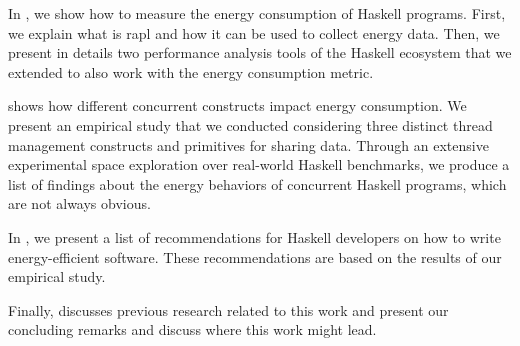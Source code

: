 In \textbf{}, we show how to measure the energy consumption of Haskell programs. First, we explain what is \acs{rapl} and how it can be used to collect energy data. Then, we present in details two performance analysis tools of the Haskell ecosystem that we extended to also work with the energy consumption metric.

\textbf{} shows how different concurrent constructs impact energy consumption. We present an empirical study that we conducted considering three distinct thread management constructs and primitives for sharing data. Through an extensive experimental space exploration over real-world Haskell benchmarks, we produce a list of findings about the energy behaviors of concurrent Haskell programs, which are not always obvious.

In \textbf{}, we present a list of recommendations for Haskell developers on how to write energy-efficient software. These recommendations are based on the results of our empirical study.

Finally, \textbf{} discusses previous research related to this work and \textbf{} present our concluding remarks and discuss where this work might lead.
